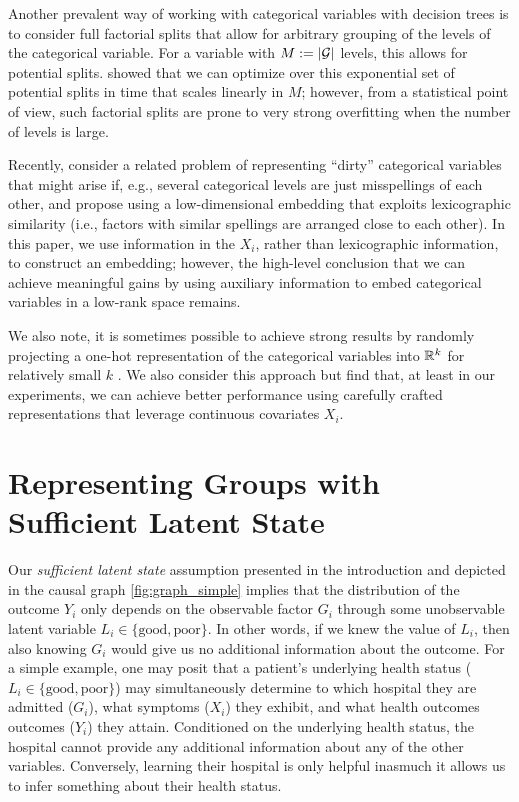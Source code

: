 \documentclass{article}
\theoremstyle{plain}
\theoremstyle{definition}
\theoremstyle{remark}
\begin{document}
Another prevalent way of working with categorical variables with decision trees
is to consider full factorial splits that allow for arbitrary grouping of the levels of the categorical
variable. For a variable with $M := \left\lvert\mathcal{G}\right\rvert$ levels, this allows
for  potential splits. \citet{breiman1984classification} showed that
we can optimize over this exponential set of potential splits in time that scales linearly in $M$;
however, from a statistical point of view, such factorial splits are prone to very strong overfitting
when the number of levels is large.

Recently, \citet{cerda2018similarity} consider a related problem of representing ``dirty'' categorical
variables that might arise if, e.g., several categorical levels are just misspellings of each other, and
propose using a low-dimensional embedding that exploits lexicographic similarity (i.e., factors with
similar spellings are arranged close to each other). In this paper, we use information in the $X_i$,
rather than lexicographic information, to construct an embedding; however, the high-level conclusion
that we can achieve meaningful gains by using auxiliary information to embed categorical variables in
a low-rank space remains.

We also note, it is sometimes possible to achieve strong results by randomly projecting a one-hot
representation of the categorical variables into $\mathbb{R}^k$ for relatively small $k$ \citep{rahimi2008random}. We also
consider this approach but find that, at least in our experiments, we can achieve better
performance using carefully crafted representations that leverage continuous covariates $X_i$.








\section{Representing Groups with Sufficient Latent State}

Our \emph{sufficient latent state} assumption presented in the introduction and depicted in the causal graph \ref{fig:graph_simple} implies that the distribution of the outcome $Y_{i}$ only depends on the observable factor $G_{i}$ through some unobservable latent variable $L_{i} \in \{\text{good}, \text{poor} \}$. In other words, if we knew the value of $L_{i}$, then also knowing $G_{i}$ would give us no additional information about the outcome. For a simple example, one may posit that a patient's underlying health status ($L_{i} \in \{\text{good}, \text{poor}\}$) may simultaneously determine to which hospital they are admitted ($G_{i}$), what symptoms ($X_i$) they exhibit, and what health outcomes outcomes ($Y_i$) they attain. Conditioned on the underlying health status, the hospital cannot provide any additional information about any of the other variables. Conversely, learning their hospital is only helpful inasmuch it allows us to infer something about their health status.
\end{document}

